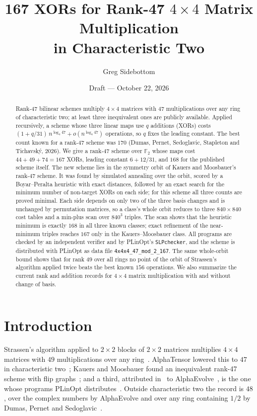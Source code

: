 \documentclass[11pt]{article}
\title{167 XORs for Rank-47 $4\times4$ Matrix Multiplication\\
in Characteristic Two}
\author{Greg Sidebottom}
\date{Draft --- October 22, 2026}
\theoremstyle{remark}
\newcommand{\F}{\mathbb{F}}
\begin{document}
\maketitle

\begin{abstract}
Rank-47 bilinear schemes multiply $4\times4$ matrices with $47$
multiplications over any ring of characteristic two; at least three
inequivalent ones are publicly available.  Applied recursively, a
scheme whose three linear maps use $q$ additions (XORs) costs
$(1+q/31)\,n^{\log_4 47}+o(n^{\log_4 47})$ operations, so $q$ fixes
the leading constant.  The best count known for a rank-47 scheme was
$170$ (Dumas, Pernet, Sedoglavic, Stapleton and Tichavsk\'y, 2026).  We
give a rank-47 scheme over $\F_2$ whose maps cost
$44+49+74=167$ XORs, leading constant $6+12/31$, and $168$ for the
published scheme itself.  The new scheme lies in the symmetry orbit of
Kauers and Moosbauer's rank-47 scheme.  It was found by simulated
annealing over the orbit, scored by a Boyar--Peralta heuristic with
exact distances, followed by an exact search for the minimum number of
non-target XORs on each side; for this scheme all three counts are
proved minimal.  Each side depends on only two of the three basis
changes and is unchanged by permutation matrices, so a class's whole
orbit reduces to three $840\times840$ cost tables and a min-plus scan
over $840^3$ triples.  The scan shows that the heuristic minimum is
exactly $168$ in all three known classes; exact refinement of the
near-minimum triples reaches $167$ only in the Kauers--Moosbauer class.
All programs are checked
by an independent verifier and by PLinOpt's \texttt{SLPchecker}, and
the scheme is distributed with PLinOpt as data file
\texttt{4x4x4\_47\_mod\_2\_167}.  The same whole-orbit bound shows that
for rank $49$ over all rings no point of the orbit of Strassen's
algorithm applied twice beats the best known $156$ operations.  We
also summarize the current rank and addition records for $4\times4$
matrix multiplication with and without change of basis.
\end{abstract}

\section{Introduction}

Strassen's algorithm applied to $2\times2$ blocks of $2\times2$
matrices multiplies $4\times4$ matrices with $49$ multiplications over
any ring~\cite{Strassen69}.  AlphaTensor lowered this to $47$ in
characteristic two~\cite{Fawzi22}; Kauers and Moosbauer found an
inequivalent rank-47 scheme with flip graphs~\cite{KM23}; and a third,
attributed in~\cite{DPSST26} to AlphaEvolve~\cite{Novikov25}, is the
one whose programs PLinOpt distributes~\cite{PLinOpt}.  Outside
characteristic two the record is $48$, over the complex numbers by
AlphaEvolve and over any ring containing $1/2$ by Dumas, Pernet and
Sedoglavic~\cite{DPS25}.
\end{document}
